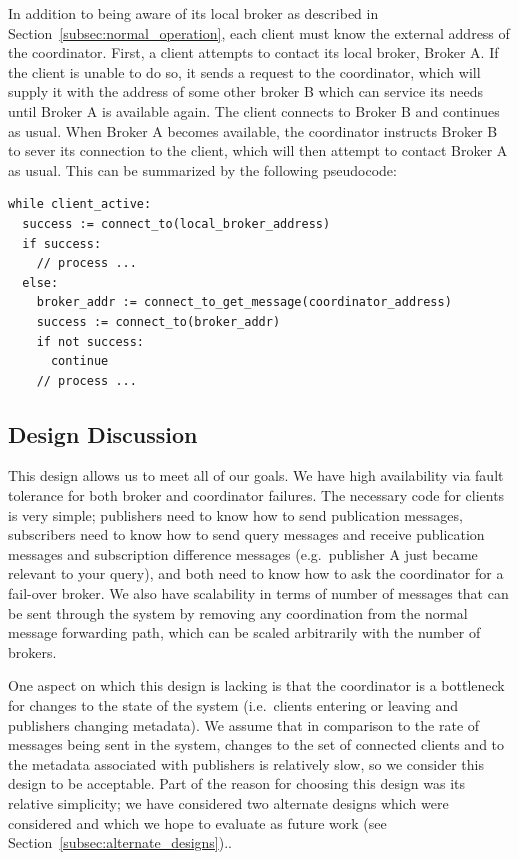 In addition to being aware of its local broker as described in Section~\ref{subsec:normal_operation}, each client must know the external address of the coordinator.
First, a client attempts to contact its local broker, Broker A.
If the client is unable to do so, it sends a request to the coordinator, which will supply it with the address of some other broker B which can service its needs until Broker A is available again.
The client connects to Broker B and continues as usual.
When Broker A becomes available, the coordinator instructs Broker B to sever its connection to the client, which will then attempt to contact Broker A as usual. This can be summarized by the following pseudocode:

\begin{lstlisting}[language=pseudocode,basicstyle=\small]
while client_active:
  success := connect_to(local_broker_address)
  if success:
    // process ...
  else:
    broker_addr := connect_to_get_message(coordinator_address)
    success := connect_to(broker_addr)
    if not success:
      continue
    // process ...
\end{lstlisting}

\subsection{Design Discussion}

This design allows us to meet all of our goals.
We have high availability via fault tolerance for both broker and coordinator failures.
The necessary code for clients is very simple; publishers need to know how to send publication messages, subscribers need to know how to send query messages and receive publication messages and subscription difference messages (e.g.\ publisher A just became relevant to your query), and both need to know how to ask the coordinator for a fail-over broker.
We also have scalability in terms of number of messages that can be sent through the system by removing any coordination from the normal message forwarding path, which can be scaled arbitrarily with the number of brokers.

One aspect on which this design is lacking is that the coordinator is a bottleneck for changes to the state of the system (i.e.\ clients entering or leaving and publishers changing metadata).
We assume that in comparison to the rate of messages being sent in the system, changes to the set of connected clients and to the metadata associated with publishers is relatively slow, so we consider this design to be acceptable.
Part of the reason for choosing this design was its relative simplicity; we have considered two alternate designs which were considered and which we hope to evaluate as future work (see Section~\ref{subsec:alternate_designs})..


